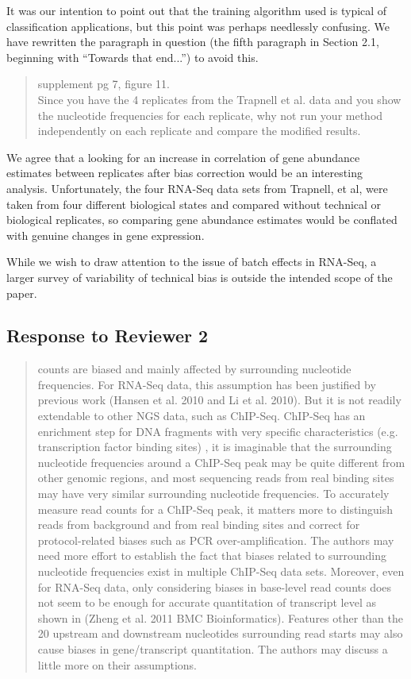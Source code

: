 \documentclass{article}
\begin{document}
It was our intention to point out that the training algorithm used is typical of
classification applications, but this point was perhaps needlessly confusing.
We have rewritten the paragraph in question (the fifth paragraph in Section 2.1,
beginning with ``Towards that end...'') to avoid this.


\begin{quote}
supplement pg 7, figure 11. \\
Since you have the 4 replicates from the Trapnell et al. data and you show the
nucleotide frequencies for each replicate, why not run your method independently
on each replicate and compare the modified results.
\end{quote}

We agree that a looking for an increase in correlation of gene abundance
estimates between replicates after bias correction would be an interesting
analysis. Unfortunately, the four RNA-Seq data sets from Trapnell, et al, were
taken from four different biological states and compared without technical or
biological replicates, so comparing gene abundance estimates would be conflated
with genuine changes in gene expression.

While we wish to draw attention to the issue of batch effects in RNA-Seq, a larger
survey of variability of technical bias is outside the intended scope of the
paper.






\subsection*{Response to Reviewer 2}

\begin{quote}
counts are biased and mainly affected by surrounding nucleotide frequencies.
For RNA-Seq data, this assumption has been justified by previous work (Hansen et
al. 2010 and Li et al. 2010). But it is not readily extendable to other NGS
data, such as ChIP-Seq. ChIP-Seq has an enrichment step for DNA fragments with
very specific characteristics (e.g. transcription factor binding sites) , it is
imaginable that the surrounding nucleotide frequencies around a ChIP-Seq peak
may be quite different from other genomic regions, and most sequencing reads
from real binding sites may have very similar surrounding nucleotide
frequencies. To accurately measure read counts for a ChIP-Seq peak, it matters
more to distinguish reads from background and from real binding sites and
correct for protocol-related biases such as PCR over-amplification. The authors
may need more effort to establish the fact that biases related to surrounding
nucleotide frequencies exist in multiple ChIP-Seq data sets. Moreover, even for
RNA-Seq data, only considering biases in base-level read counts does not seem to
be enough for accurate quantitation of transcript level as shown in (Zheng et
al. 2011 BMC Bioinformatics). Features other than the 20 upstream and downstream
nucleotides surrounding read starts may also cause biases in gene/transcript
quantitation. The authors may discuss a little more on their assumptions.
\end{quote}
\end{document}
